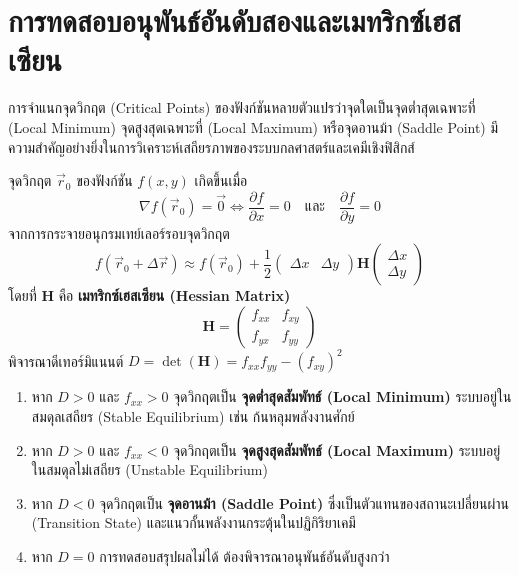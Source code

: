 \section{การทดสอบอนุพันธ์อันดับสองและเมทริกซ์เฮสเซียน}
การจำแนกจุดวิกฤต (Critical Points) ของฟังก์ชันหลายตัวแปรว่าจุดใดเป็นจุดต่ำสุดเฉพาะที่ (Local Minimum) จุดสูงสุดเฉพาะที่ (Local Maximum) หรือจุดอานม้า (Saddle Point) มีความสำคัญอย่างยิ่งในการวิเคราะห์เสถียรภาพของระบบกลศาสตร์และเคมีเชิงฟิสิกส์

จุดวิกฤต $\vec{r}_0$ ของฟังก์ชัน $f(x, y)$ เกิดขึ้นเมื่อ
\begin{equation}
\nabla f(\vec{r}_0) = \vec{0} \iff \frac{\partial f}{\partial x} = 0 \quad \text{และ} \quad \frac{\partial f}{\partial y} = 0
\end{equation}
จากการกระจายอนุกรมเทย์เลอร์รอบจุดวิกฤต
\begin{equation}
f(\vec{r}_0 + \Delta \vec{r}) \approx f(\vec{r}_0) + \frac{1}{2} \begin{pmatrix} \Delta x & \Delta y \end{pmatrix} \mathbf{H} \begin{pmatrix} \Delta x \\ \Delta y \end{pmatrix}
\end{equation}
โดยที่ $\mathbf{H}$ คือ \textbf{เมทริกซ์เฮสเซียน (Hessian Matrix)}
\begin{equation}
\mathbf{H} = \begin{pmatrix}
f_{xx} & f_{xy} \\
f_{yx} & f_{yy}
\end{pmatrix}
\end{equation}
พิจารณาดีเทอร์มิแนนต์ $D = \det(\mathbf{H}) = f_{xx}f_{yy} - (f_{xy})^2$
\begin{enumerate}
    \item หาก $D > 0$ และ $f_{xx} > 0$  จุดวิกฤตเป็น \textbf{จุดต่ำสุดสัมพัทธ์ (Local Minimum)} ระบบอยู่ในสมดุลเสถียร (Stable Equilibrium) เช่น ก้นหลุมพลังงานศักย์
    \item หาก $D > 0$ และ $f_{xx} < 0$  จุดวิกฤตเป็น \textbf{จุดสูงสุดสัมพัทธ์ (Local Maximum)} ระบบอยู่ในสมดุลไม่เสถียร (Unstable Equilibrium)
    \item หาก $D < 0$  จุดวิกฤตเป็น \textbf{จุดอานม้า (Saddle Point)} ซึ่งเป็นตัวแทนของสถานะเปลี่ยนผ่าน (Transition State) และแนวกั้นพลังงานกระตุ้นในปฏิกิริยาเคมี
    \item หาก $D = 0$  การทดสอบสรุปผลไม่ได้ ต้องพิจารณาอนุพันธ์อันดับสูงกว่า
\end{enumerate}

